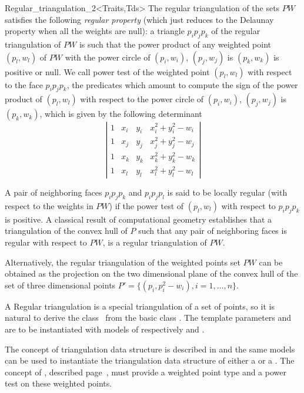 \begin{ccRefClass}{Regular_triangulation_2<Traits,Tds>}
The regular triangulation of the sets ${  PW}$
satisfies the following {\em regular property} (which just reduces to the 
Delaunay property when all the weights are null):
a triangle $p_ip_jp_k$ of the regular triangulation
of ${  PW}$ is such that the power product of any weighted point
 $(p_l, w_l)$ of ${  PW}$ with the power circle of
 $(p_i, w_i)$, $(p_j, w_j)$ is $(p_k, w_k)$ is positive or null.
We call  power test of the weighted point $(p_l, w_l)$ with respect
to the face  $p_ip_jp_k$, the predicates which amount to compute
the sign of 
the power product of $(p_l, w_l)$ with respect to
the power circle of
 $(p_i, w_i)$, $(p_j, w_j)$ is $(p_k, w_k)$,
which is given by the following
determinant
\[\left| \begin{array}{cccc}
1  &  x_i  &  y_i  &  x_i ^2 + y_i ^2 - w_i  \\
1  &  x_j  &  y_j  &  x_j ^2 + y_j ^2 - w_j  \\
1  &  x_k  &  y_k  &  x_k ^2 + y_k ^2 - w_k  \\
1  &  x_l  &  y_l  &  x_l ^2 + y_l ^2 - w_l
\end{array}
\right|
\]

A pair of neighboring faces $p_ip_jp_k$
and $p_ip_jp_l$ is said to be locally regular
(with respect to  the weights in ${  PW}$)
if the power test of $(p_l,w_l)$ with respect to
$p_ip_jp_k$ is positive.
A classical  result of computational geometry
establishes that a triangulation of the convex hull of ${  P}$
such that any pair of neighboring faces is regular with respect
to ${  PW}$, is a
 regular triangulation of ${  PW}$.

Alternatively, the regular triangulation
of the weighted points set ${  PW}$
can be obtained as the projection
on the two dimensional plane of the convex hull of the set of three
dimensional points 
${  P'}= \{ (p_i,p_i ^2 - w_i ), i = 1, \ldots , n \}$.



 
A Regular triangulation is a special triangulation of a set of points,
so it is natural to derive  the class \ccRefName\
from the basic class .
The template parameters  and  
are to be instantiated with models of respectively
  and
.


The concept of triangulation data structure
is described in 
and the same models can be used to instantiate the
triangulation data structure of either a 
or a \ccRefName.
The  concept of ,
described page~, 
must provide a weighted point type
and a power test on these weighted points. 


\end{ccRefClass}
